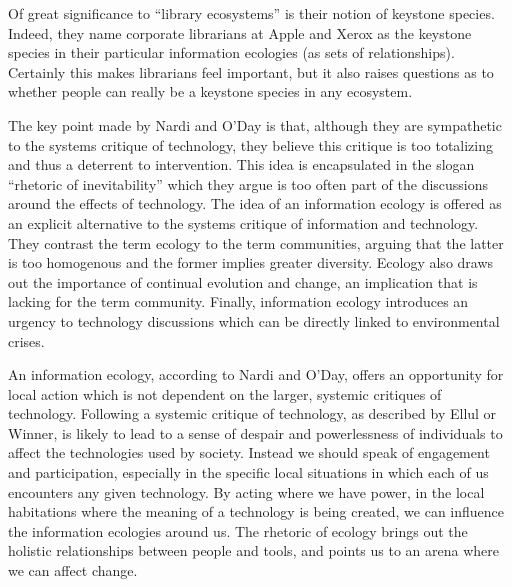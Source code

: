 Of great significance to ``library ecosystems'' is their notion of keystone species. Indeed, they name corporate librarians at Apple and Xerox as the keystone species in their particular information ecologies (as sets of relationships). Certainly this makes librarians feel important, but it also raises questions as to whether people can really be a keystone species in any ecosystem.

The key point made by Nardi and O'Day is that, although they are sympathetic to the systems critique of technology, they believe this critique is too totalizing and thus a deterrent to intervention. This idea is encapsulated in the slogan ``rhetoric of inevitability'' which they argue is too often part of the discussions around the effects of technology. The idea of an information ecology is offered as an explicit alternative to the systems critique of information and technology. They contrast the term ecology to the term communities, arguing that the latter is too homogenous and the former implies greater diversity. Ecology also draws out the importance of continual evolution and change, an implication that is lacking for the term community.  Finally, information ecology introduces an urgency to technology discussions which can be directly linked to environmental crises.

An information ecology, according to Nardi and O'Day, offers an opportunity for local action which is not dependent on the larger, systemic critiques of technology.  Following a systemic critique of technology, as described by Ellul or Winner, is likely to lead to a sense of despair and powerlessness of individuals to affect the technologies used by society. Instead we should speak of engagement and participation, especially in the specific local situations in which each of us encounters any given technology. By acting where we have power, in the local habitations where the meaning of a technology is being created, we can influence the information ecologies around us. The rhetoric of ecology brings out the holistic relationships between people and tools, and points us to an arena where we can affect change.